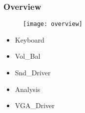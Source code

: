 \begin{frame}
  \frametitle{Overview}
    \begin{figure}
      \centering
      \texttt{[image: overview]}
    \end{figure}


    \begin{itemize}
      \item Keyboard
      \item Vol\_Bal
      \item Snd\_Driver
      \item Analysis
      \item VGA\_Driver
    \end{itemize}

\end{frame}
